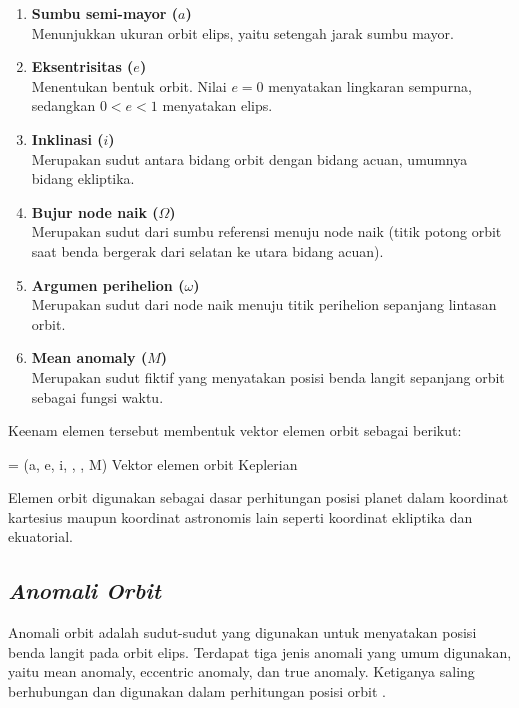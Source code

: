 \begin{enumerate}
	\item \textbf{Sumbu semi-mayor ($a$)}\\
	Menunjukkan ukuran orbit elips, yaitu setengah jarak sumbu mayor.
	
	\item \textbf{Eksentrisitas ($e$)}\\
	Menentukan bentuk orbit. Nilai $e = 0$ menyatakan lingkaran sempurna, sedangkan $0 < e < 1$ menyatakan elips.
	
	\item \textbf{Inklinasi ($i$)}\\
	Merupakan sudut antara bidang orbit dengan bidang acuan, umumnya bidang ekliptika.
	
	\item \textbf{Bujur node naik ($\Omega$)}\\
	Merupakan sudut dari sumbu referensi menuju node naik (titik potong orbit saat benda bergerak dari selatan ke utara bidang acuan).
	
	\item \textbf{Argumen perihelion ($\omega$)}\\
	Merupakan sudut dari node naik menuju titik perihelion sepanjang lintasan orbit.
	
	\item \textbf{Mean anomaly ($M$)}\\
	Merupakan sudut fiktif yang menyatakan posisi benda langit sepanjang orbit sebagai fungsi waktu.
\end{enumerate}

Keenam elemen tersebut membentuk vektor elemen orbit sebagai berikut:

\begin{equationcaptioned}[eq:2.vektorElemenOrbit]{
		 =
		(a, e, i, \Omega, \omega, M)
	}{
		Vektor elemen orbit Keplerian \cite{vallado}
	}
\end{equationcaptioned}

Elemen orbit digunakan sebagai dasar perhitungan posisi planet dalam koordinat kartesius maupun koordinat astronomis lain seperti koordinat ekliptika dan ekuatorial.

\subsection{\textit{Anomali Orbit}} \label{II.TeoriAnomali}

Anomali orbit adalah sudut-sudut yang digunakan untuk menyatakan posisi benda langit pada orbit elips. Terdapat tiga jenis anomali yang umum digunakan, yaitu mean anomaly, eccentric anomaly, dan true anomaly. Ketiganya saling berhubungan dan digunakan dalam perhitungan posisi orbit \cite{Meeus1998}.

